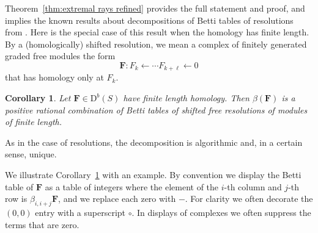\documentclass[12pt]{amsart}
\newtheorem{cor}[lemma]{Corollary}
\theoremstyle{definition}
\theoremstyle{remark}
\newcommand{\FF}{\mathbf{F}}
\newcommand{\DD}{\mathrm{D}}
\begin{document}
Theorem~\ref{thm:extremal rays refined} provides the full statement and proof, and implies the known results about decompositions of Betti tables
of resolutions from \cites{eis-schrey1,boij-sod2}.  Here is the special case of this result when the homology has finite length. By a (homologically) shifted resolution, we mean a complex of
finitely generated graded free modules the form
$$
\FF: F_{k}\leftarrow\cdots F_{k+\ell}\leftarrow 0
$$
that has homology only at $F_{k}$.
 
\begin{cor}\label{cor:decompose}
Let $\FF\in \DD^b(S)$ have finite length homology.  Then $\beta(\FF)$ is a positive rational combination of Betti tables of shifted free resolutions of modules of finite length. 
\end{cor}
As in the case of resolutions, the decomposition is algorithmic and, in a certain sense, unique.

We illustrate Corollary~\ref{cor:decompose} with an example.  By convention we display the Betti table of $\FF$ as a table
of integers where the element of the $i$-th column and $j$-th row is $\beta_{i,i+j}\FF$, and we replace each zero with $-$. For clarity we often decorate the $(0,0)$ entry
with a superscript $\circ$. In displays of complexes we often suppress the terms that are zero.
\end{document}
